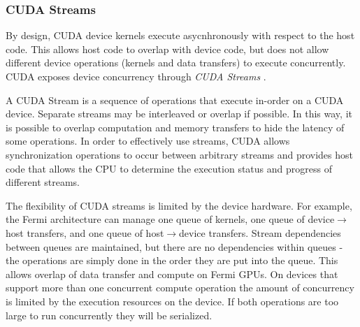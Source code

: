 
\subsubsection*{CUDA Streams}
By design, CUDA device kernels execute asycnhronously with respect to the
host code. This allows host code to overlap with device code, but does not
allow different device operations (kernels and data transfers) to execute
concurrently. CUDA exposes device concurrency through \textit{CUDA Streams}
\cite{kirk2012programming}.

A CUDA Stream is a sequence of operations that
execute in-order on a CUDA device. Separate streams may be interleaved or
overlap if possible. In this way, it is possible to overlap computation and
memory transfers to hide the latency of some operations.
In order to effectively use streams, CUDA allows synchronization operations
to occur between arbitrary streams and provides host code that allows the
CPU to determine the execution status and progress of different streams.

The flexibility of CUDA streams is limited by the device hardware.
For example, the Fermi architecture can manage one queue of kernels, one queue
of device$\rightarrow$host transfers, and one queue of host$\rightarrow$device
transfers. Stream
dependencies between queues are maintained, but there are no dependencies
within queues - the operations are simply done in the order they are put into
the queue. This allows overlap of data transfer and compute on Fermi GPUs.
On devices that support more than one concurrent compute operation the amount
of concurrency is limited by the execution resources on the device. If both
operations are too large to run concurrently they will be serialized.